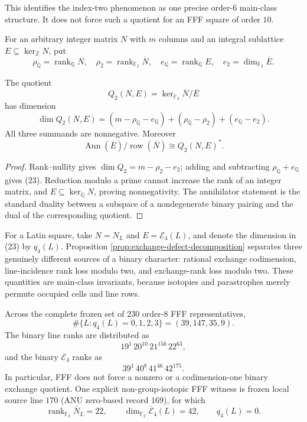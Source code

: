 This identifies the index-two phenomenon as one precise order-$6$ main-class
structure.  It does not force such a quotient for an FFF square of order $10$.

For an arbitrary integer matrix $N$ with $m$ columns and an integral
sublattice $E\subseteq\ker_{\mathbb Z}N$, put
\[
 \rho_{\mathbb Q}=\operatorname{rank}_{\mathbb Q}N,\quad
 \rho_2=\operatorname{rank}_{\mathbb F_2}\overline N,\quad
 e_{\mathbb Q}=\operatorname{rank}_{\mathbb Q}E,\quad
 e_2=\dim_{\mathbb F_2}\overline E.
\]

\begin{proposition}
\label{prop:exchange-defect-decomposition}
The quotient
\[
 Q_2(N,E)=\ker_{\mathbb F_2}\overline N/\overline E
\]
has dimension
\[
 \dim Q_2(N,E)
 =(m-\rho_{\mathbb Q}-e_{\mathbb Q})
  +(\rho_{\mathbb Q}-\rho_2)
  +(e_{\mathbb Q}-e_2).
 \tag{23}
\]
All three summands are nonnegative.  Moreover
\[
 \operatorname{Ann}(\overline E)/\operatorname{row}(\overline N)
 \cong Q_2(N,E)^*.
\]
\end{proposition}

\begin{proof}
Rank--nullity gives $\dim Q_2=m-\rho_2-e_2$; adding and subtracting
$\rho_{\mathbb Q}+e_{\mathbb Q}$ gives (23).  Reduction modulo a prime
cannot increase the rank of an integer matrix, and
$E\subseteq\ker_{\mathbb Q}N$, proving nonnegativity.  The annihilator
statement is the standard duality between a subspace of a nondegenerate
binary pairing and the dual of the corresponding quotient.
\end{proof}

For a Latin square, take $N=N_L$ and $E=\mathcal E_4(L)$, and denote the
dimension in (23) by $q_4(L)$.  Proposition
\ref{prop:exchange-defect-decomposition} separates three genuinely different
sources of a binary character: rational exchange codimension, line-incidence
rank loss modulo two, and exchange-rank loss modulo two.  These quantities
are main-class invariants, because isotopies and parastrophes merely permute
occupied cells and line rows.

\begin{computationaltheorem}
\label{cthm:order8-exchange-parity-controls}
Across the complete frozen set of $230$ order-$8$ FFF representatives,
\[
 \#\{L:q_4(L)=0,1,2,3\}=(39,147,35,9).
\]
The binary line ranks are distributed as
\[
 19^1\,20^{10}\,21^{156}\,22^{63},
\]
and the binary $\mathcal E_4$ ranks as
\[
 39^1\,40^8\,41^{46}\,42^{175}.
\]
In particular, FFF does not force a nonzero or a codimension-one binary
exchange quotient.  One explicit non-group-isotopic FFF witness is frozen
local source line $170$ (ANU zero-based record $169$), for which
\[
 \operatorname{rank}_{\mathbb F_2}\overline N_L=22,\qquad
 \dim_{\mathbb F_2}\overline{\mathcal E}_4(L)=42,\qquad q_4(L)=0.
\]
\end{computationaltheorem}

